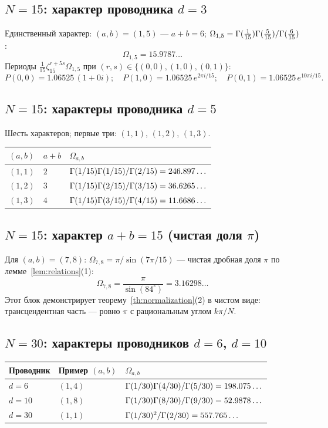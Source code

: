 \subsection{$N=15$: характер проводника $d=3$}

Единственный характер: $(a,b)=(1,5)$ --- $a+b=6$;
$\Omega_{1,5}=\Gamma(\tfrac1{15})\Gamma(\tfrac5{15})/\Gamma(\tfrac6{15})$:
\[
  \Omega_{1,5}=15.9787\ldots
\]
Периоды $\frac1{15}\zeta_{15}^{r+5s}\Omega_{1,5}$ при
$(r,s)\in\{(0,0),(1,0),(0,1)\}$:
\[
  P(0,0)=1.06525\,(1+0i);\quad
  P(1,0)=1.06525\,e^{2\pi i/15};\quad
  P(0,1)=1.06525\,e^{10\pi i/15}.
\]

\subsection{$N=15$: характеры проводника $d=5$}

Шесть характеров; первые три: $(1,1)$, $(1,2)$, $(1,3)$.
\begin{center}
\small
\begin{tabular}{@{}l l l@{}}
\toprule
$(a,b)$ & $a+b$ & $\Omega_{a,b}$ \\
\midrule
$(1,1)$ & $2$ & $\Gamma(1/15)\Gamma(1/15)/\Gamma(2/15)=246.897\ldots$ \\
$(1,2)$ & $3$ & $\Gamma(1/15)\Gamma(2/15)/\Gamma(3/15)=36.6265\ldots$ \\
$(1,3)$ & $4$ & $\Gamma(1/15)\Gamma(3/15)/\Gamma(4/15)=11.6686\ldots$ \\
\bottomrule
\end{tabular}
\end{center}

\subsection{$N=15$: характер $a+b=15$ (чистая доля $\pi$)}

Для $(a,b)=(7,8)$: $\Omega_{7,8}=\pi/\sin(7\pi/15)$ ---
чистая дробная доля $\pi$ по лемме~\ref{lem:relations}(1):
\[
  \Omega_{7,8}=\frac{\pi}{\sin(84^\circ)}=3.16298\ldots
\]
Этот блок демонстрирует теорему~\ref{th:normalization}(2) в чистом
виде: трансцендентная часть --- ровно $\pi$ с рациональным углом
$k\pi/N$.

\subsection{$N=30$: характеры проводников $d=6$, $d=10$}

\begin{center}
\small
\begin{tabular}{@{}l l l@{}}
\toprule
Проводник & Пример $(a,b)$ & $\Omega_{a,b}$ \\
\midrule
$d=6$ & $(1,4)$ & $\Gamma(1/30)\Gamma(4/30)/\Gamma(5/30)=198.075\ldots$ \\
$d=10$ & $(1,8)$ & $\Gamma(1/30)\Gamma(8/30)/\Gamma(9/30)=52.9878\ldots$ \\
$d=30$ & $(1,1)$ & $\Gamma(1/30)^2/\Gamma(2/30)=557.765\ldots$ \\
\bottomrule
\end{tabular}
\end{center}

